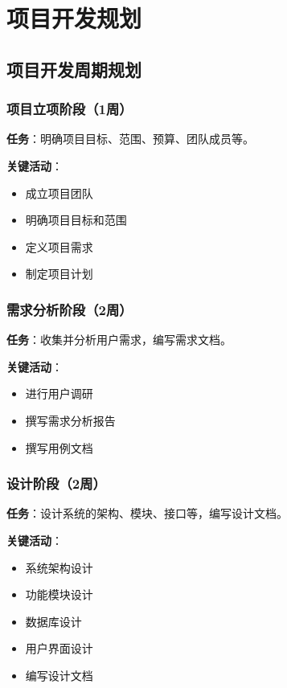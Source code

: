 \section{项目开发规划}


\subsection{项目开发周期规划}

\subsubsection{项目立项阶段（1周）}

\textbf{任务}：明确项目目标、范围、预算、团队成员等。


\textbf{关键活动}：
\begin{itemize}[itemsep=2pt,topsep=0pt,parsep=0pt,itemindent=1em]
    \item 成立项目团队
    \item 明确项目目标和范围
    \item 定义项目需求
    \item 制定项目计划
\end{itemize}


\subsubsection{需求分析阶段（2周）}
\textbf{任务}：收集并分析用户需求，编写需求文档。

\textbf{关键活动}：
\begin{itemize}[itemsep=2pt,topsep=0pt,parsep=0pt,itemindent=1em]
    \item 进行用户调研
    \item 撰写需求分析报告
    \item 撰写用例文档
\end{itemize}



\subsubsection{设计阶段（2周）}
\textbf{任务}：设计系统的架构、模块、接口等，编写设计文档。 

\textbf{关键活动}：
\begin{itemize}[itemsep=2pt,topsep=0pt,parsep=0pt,itemindent=1em]
    \item 系统架构设计
    \item 功能模块设计
    \item 数据库设计
    \item 用户界面设计
    \item 编写设计文档
\end{itemize}



